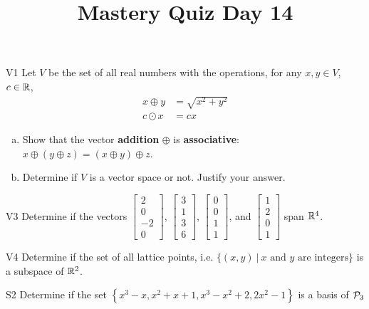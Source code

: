 \documentclass{sbgLAquiz}
\title{Mastery Quiz Day 14 }
\begin{document}
\begin{problem}{V1}
Let $V$ be the set of all real numbers with the operations, for any $x, y \in V$, $c \in \IR$,
\begin{align*}
x \oplus y &= \sqrt{x^2+y^2} \\
c \odot x &= c x
\end{align*}
\begin{enumerate}[(a)]
\item Show that the vector \textbf{addition} $\oplus$ is \textbf{associative}:
      \(x \oplus (y \oplus z)=(x\oplus y)\oplus z\).
\item Determine if $V$ is a vector space or not.  Justify your answer.
\end{enumerate}
\end{problem}

\begin{problem}{V3}
Determine if the vectors $\begin{bmatrix} 2 \\ 0 \\ -2 \\ 0 \end{bmatrix}$, $\begin{bmatrix} 3 \\ 1 \\ 3 \\ 6 \end{bmatrix}$, $\begin{bmatrix} 0 \\ 0 \\ 1 \\ 1 \end{bmatrix}$, and $\begin{bmatrix}1 \\ 2 \\ 0 \\ 1 \end{bmatrix}$ span $\IR^4$.
\end{problem}
\newpage

\begin{problem}{V4}
Determine if the set of all lattice points, i.e. $\{(x,y)\ \big|\ \text{$x$ and $y$ are integers} \}$ is a subspace of $\IR^2$.
\end{problem}

\begin{problem}{S2}
Determine if the set $\left\{ x^3-x, x^2+x+1, x^3-x^2+2, 2x^2-1 \right\}$ is a basis of $\P_3$
\end{problem}
\end{document}
